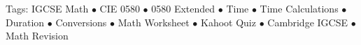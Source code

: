 \documentclass[11pt,a4paper]{article}
\begin{document}
\vspace{14pt}
\begin{center}
  \sffamily\scriptsize\textcolor{textmuted}{
    Tags: IGCSE Math $\bullet$ CIE 0580 $\bullet$ 0580 Extended $\bullet$ Time $\bullet$ Time Calculations $\bullet$ Duration $\bullet$ Conversions $\bullet$ Math Worksheet $\bullet$ Kahoot Quiz $\bullet$ Cambridge IGCSE $\bullet$ Math Revision
  }
\end{center}
\end{document}
